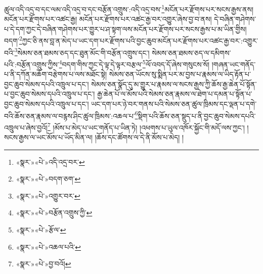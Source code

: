 ཚུལ་འདི་འདྲ་བ་དང་ལམ་འདི་འདྲ་བ་དང་བརྩོན་འགྲུས་:འདི་འདྲ་བས་\footnote{«སྣར་»«པེ་»འདི་འདྲ་བར་}མངོན་པར་རྫོགས་པར་སངས་རྒྱས་ནས། མངོན་པར་རྫོགས་པར་འཚང་རྒྱ། མངོན་པར་རྫོགས་པར་འཚང་རྒྱ་བར་འགྱུར་ཞེས་བྱ་བ་ནས། དེ་བཞིན་གཤེགས་པ་དེ་དག་ཀྱང་དེ་བཞིན་གཤེགས་པར་གྱུར་པ་ཤ་སྟག་ལས་མངོན་པར་རྫོགས་པར་སངས་རྒྱས་པ་མ་ཡིན་གྱིས། བདག་\footnote{«སྣར་»«པེ་»བདག་ཅག་}ཀྱང་ཅི་ནས་བླ་ན་མེད་པ་ཡང་དག་པར་རྫོགས་པའི་བྱང་ཆུབ་མངོན་པར་རྫོགས་པར་འཚང་རྒྱ་བར་:འགྱུར་བའི་\footnote{«སྣར་»«པེ་»འགྱུར་བར་}སེམས་ཅན་ཐམས་ཅད་དང་ཐུན་མོང་གི་བརྩོན་འགྲུས་དང་། སེམས་ཅན་ཐམས་ཅད་ལ་དམིགས་པའི་:བརྩོན་འགྲུས་ཀྱིས་\footnote{«སྣར་»«པེ་»བརྩོན་འགྲུས་ཀྱི་}བདག་གིས་ཀྱང་དེ་ལྟ་དེ་ལྟར་བརྩལ་\footnote{«སྣར་»«པེ་»རྩོལ་}ལོ་འབད་དོ་ཞེས་གསུངས་སོ། །གཞན་ཡང་གནོད་པ་ནི་དཀོན་མཆོག་བརྩེགས་པ་ལས་མཐོང་སྟེ། སེམས་ཅན་ཡོངས་སུ་སྨིན་པར་མ་བྱས་པ་རྣམས་ལ་ཡིད་རྟོན་པ་བྱང་ཆུབ་སེམས་དཔའི་འཁྲུལ་པ་དང་། སེམས་ཅན་སྣོད་དུ་མ་གྱུར་པ་རྣམས་ལ་སངས་རྒྱས་ཀྱི་ཆོས་རྒྱ་ཆེན་པོ་སྟོན་པ་བྱང་ཆུབ་སེམས་དཔའི་འཁྲུལ་པ་དང་། རྒྱ་ཆེན་པོ་ལ་མོས་པའི་སེམས་ཅན་རྣམས་ལ་ཐེག་པ་དམན་པ་སྟོན་པ་བྱང་ཆུབ་སེམས་དཔའི་འཁྲུལ་པ་དང་། ཡང་དག་པར་ཉེ་བར་གནས་པའི་སེམས་ཅན་ཚུལ་ཁྲིམས་དང་ལྡན་པ་དགེ་བའི་ཆོས་ཅན་རྣམས་ལ་བརྙས་ཤིང་ཚུལ་ཁྲིམས་:འཆལ་པ་\footnote{«སྣར་»«པེ་»འཆལ་པའི་}སྡིག་པའི་ཆོས་ཅན་སྡུད་པ་ནི་བྱང་ཆུབ་སེམས་དཔའི་འཁྲུལ་པ་ཞེས་བྱའོ།\footnote{«སྣར་»«པེ་»བྱ་བའོ།} །མོས་པ་མེད་པ་ཡང་གནོད་པ་ཡིན་ཏེ། །འཕགས་པ་ཡུལ་འཁོར་སྐྱོང་གི་མདོ་ལས་ཀྱང་། །སངས་རྒྱས་ལ་ཡང་མོས་པ་ཡོད་མིན་ལ། །ཆོས་དང་ཚོགས་ལ་དེ་ནི་མོས་པ་མེད། །
